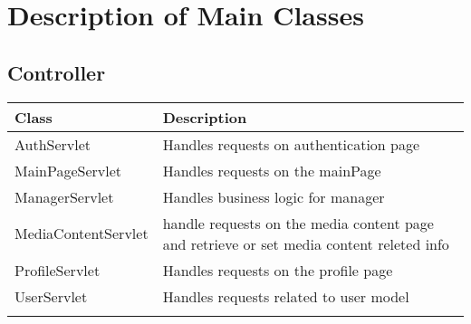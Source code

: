 \newpage

\section{Description of Main Classes}

\subsection*{Controller}
\renewcommand{\arraystretch}{1.5}
\begin{longtable}{|>{\arraybackslash}p{0.3\linewidth}|>{\arraybackslash}p{0.73\linewidth}|}
    \cline{1-2}
    \textbf{Class} & \textbf{Description} \\
    \cline{1-2}
    AuthServlet & Handles requests on authentication page \\
    \cline{1-2}
    MainPageServlet & Handles requests on the mainPage \\
    \cline{1-2}
    ManagerServlet & Handles business logic for manager \\    
    \cline{1-2}
    MediaContentServlet & handle requests on the media content page and retrieve or set media content releted info \\
    \cline{1-2}
    ProfileServlet & Handles requests on the profile page \\
    \cline{1-2}
    UserServlet & Handles requests related to user model \\
    \cline{1-2}
\end{longtable}

